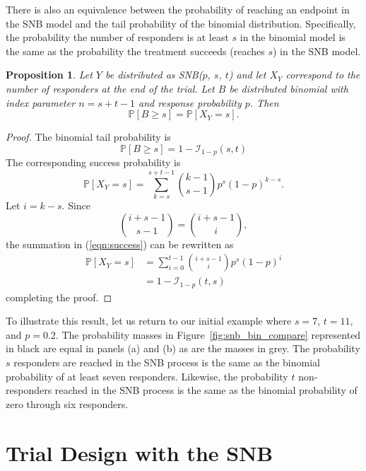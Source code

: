 \documentclass[sii]{ipart}
\newtheorem{prop}{Proposition}
\begin{document}
There is also an equivalence between the probability of reaching an endpoint 
in the SNB model and the tail probability of the binomial distribution.
Specifically, the probability the number of responders is at least 
$s$ in the binomial model is the same as the probability the treatment succeeds 
(reaches $s$) in the SNB model.
\begin{prop} \label{binomial_tail}
Let $Y$ be distributed as SNB($p$, $s$, $t$) and let $X_Y$ correspond
to the number of responders at the end of the trial. Let 
$B$ be distributed binomial with index parameter $n=s+t-1$ and response 
probability $p$. Then
\begin{equation}
\mathbb{P}[B \geq s] = \mathbb{P} [X_Y = s].
\end{equation}
\end{prop}
\begin{proof}
The binomial tail probability is
\begin{equation*}
\mathbb{P}[B \geq s] = 1 - \mathcal{I}_{1-p}(s, t)
\end{equation*}
The corresponding success probability is
\begin{equation} \label{eqn:success}
\mathbb{P} [X_Y = s] 
  = \sum_{k=s}^{s+t-1} {k-1 \choose s-1} p^s (1-p)^{k-s}.
\end{equation}
Let $i=k-s$. Since
\begin{equation*}
{i+s-1 \choose s-1} = {i+s-1 \choose i},
\end{equation*}
the summation in (\ref{eqn:success}) can be rewritten as
\begin{align*}
\mathbb{P} [X_Y = s] &= \sum_{i=0}^{t-1} {i+s-1 \choose i} p^s (1-p)^i\\
  &= 1 - \mathcal{I}_{1-p}(t, s)
\end{align*}
completing the proof.
\end{proof}

To illustrate this result, let us return to our initial example
where $s=7$, $t=11$, and $p=0.2$.  The probability masses in
Figure~\ref{fig:snb_bin_compare} represented in 
black are equal in panels (a) and (b) as are the masses in grey.
The probability $s$
responders are reached in the SNB process is the same as the binomial 
probability of at least seven responders. Likewise, the probability $t$ 
non-responders reached in the SNB process is the same as the binomial
probability of zero through six responders.

\section{Trial Design with the SNB}
\end{document}
